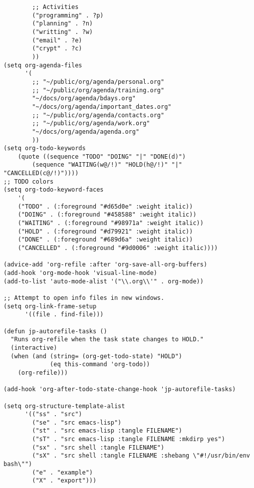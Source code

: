\documentclass[11pt]{article}
\begin{document}
\begin{verbatim}
        ;; Activities
        ("programming" . ?p)
        ("planning" . ?n)
        ("writting" . ?w)
        ("email" . ?e)
        ("crypt" . ?c)
        ))
(setq org-agenda-files
      '(
        ;; "~/public/org/agenda/personal.org"
        ;; "~/public/org/agenda/training.org"
        "~/docs/org/agenda/bdays.org"
        "~/docs/org/agenda/important_dates.org"
        ;; "~/public/org/agenda/contacts.org"
        ;; "~/public/org/agenda/work.org"
        "~/docs/org/agenda/agenda.org"
        ))
(setq org-todo-keywords
    (quote ((sequence "TODO" "DOING" "|" "DONE(d)")
        (sequence "WAITING(w@/!)" "HOLD(h@/!)" "|" "CANCELLED(c@/!)"))))
;; TODO colors
(setq org-todo-keyword-faces
    '(
    ("TODO" . (:foreground "#d65d0e" :weight italic))
    ("DOING" . (:foreground "#458588" :weight italic))
    ("WAITING" . (:foreground "#98971a" :weight italic))
    ("HOLD" . (:foreground "#d79921" :weight italic))
    ("DONE" . (:foreground "#689d6a" :weight italic))
    ("CANCELLED" . (:foreground "#9d0006" :weight italic))))

(advice-add 'org-refile :after 'org-save-all-org-buffers)
(add-hook 'org-mode-hook 'visual-line-mode)
(add-to-list 'auto-mode-alist '("\\.org\\'" . org-mode))

;; Attempt to open info files in new windows.
(setq org-link-frame-setup
      '((file . find-file)))

(defun jp-autorefile-tasks ()
  "Runs org-refile when the task state changes to HOLD."
  (interactive)
  (when (and (string= (org-get-todo-state) "HOLD")
             (eq this-command 'org-todo))
    (org-refile)))

(add-hook 'org-after-todo-state-change-hook 'jp-autorefile-tasks)

(setq org-structure-template-alist
      '(("ss" . "src")
        ("se" . "src emacs-lisp")
        ("st" . "src emacs-lisp :tangle FILENAME")
        ("sT" . "src emacs-lisp :tangle FILENAME :mkdirp yes")
        ("sx" . "src shell :tangle FILENAME")
        ("sX" . "src shell :tangle FILENAME :shebang \"#!/usr/bin/env bash\"")
        ("e" . "example")
        ("X" . "export")))
\end{verbatim}
\end{document}
